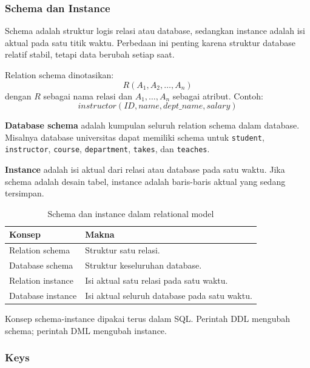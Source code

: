 \subsubsection{Schema dan Instance}

\begin{jawab}
Schema adalah struktur logis relasi atau database, sedangkan instance adalah isi aktual pada satu titik waktu. Perbedaan ini penting karena struktur database relatif stabil, tetapi data berubah setiap saat.
\end{jawab}

Relation schema dinotasikan:
\begin{equation}
    R(A_1,A_2,\ldots,A_n)
    \label{eq:relation-schema-relmodel}
\end{equation}
dengan \(R\) sebagai nama relasi dan \(A_1,\ldots,A_n\) sebagai atribut. Contoh:
\[
    instructor(ID, name, dept\_name, salary)
\]

\textbf{Database schema} adalah kumpulan seluruh relation schema dalam database. Misalnya database universitas dapat memiliki schema untuk \texttt{student}, \texttt{instructor}, \texttt{course}, \texttt{department}, \texttt{takes}, dan \texttt{teaches}.

\textbf{Instance} adalah isi aktual dari relasi atau database pada satu waktu. Jika schema adalah desain tabel, instance adalah baris-baris aktual yang sedang tersimpan.

\begin{table}[H]
\centering
\begin{tabularx}{\textwidth}{|L{0.22\textwidth}|X|}
\hline
\textbf{Konsep} & \textbf{Makna} \\
\hline
Relation schema & Struktur satu relasi. \\
\hline
Database schema & Struktur keseluruhan database. \\
\hline
Relation instance & Isi aktual satu relasi pada satu waktu. \\
\hline
Database instance & Isi aktual seluruh database pada satu waktu. \\
\hline
\end{tabularx}
\caption{Schema dan instance dalam relational model}
\label{tab:schema-instance-relmodel}
\end{table}

Konsep schema-instance dipakai terus dalam SQL. Perintah DDL mengubah schema; perintah DML mengubah instance.

\subsubsection{Keys}

